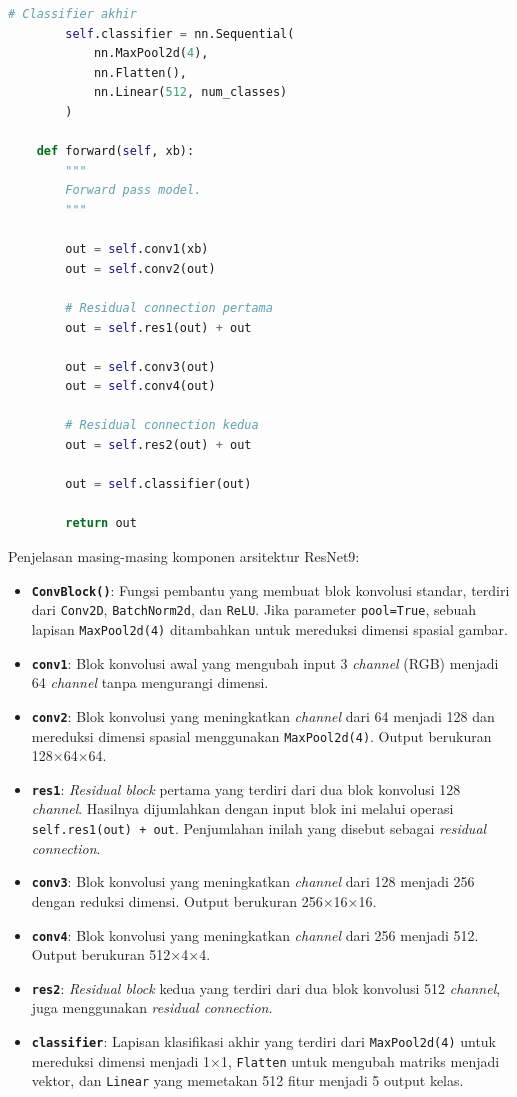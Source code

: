 \begin{lstlisting}[language=Python, caption=Membangun arsitektur ResNet9]
        # Classifier akhir
        self.classifier = nn.Sequential(
            nn.MaxPool2d(4),
            nn.Flatten(),
            nn.Linear(512, num_classes)
        )

    def forward(self, xb):
        """
        Forward pass model.
        """

        out = self.conv1(xb)
        out = self.conv2(out)

        # Residual connection pertama
        out = self.res1(out) + out

        out = self.conv3(out)
        out = self.conv4(out)

        # Residual connection kedua
        out = self.res2(out) + out

        out = self.classifier(out)

        return out
\end{lstlisting}

Penjelasan masing-masing komponen arsitektur ResNet9:

\begin{itemize}
    \item \textbf{\texttt{ConvBlock()}}: Fungsi pembantu yang membuat blok konvolusi standar, terdiri dari \texttt{Conv2D}, \texttt{BatchNorm2d}, dan \texttt{ReLU}. Jika parameter \texttt{pool=True}, sebuah lapisan \texttt{MaxPool2d(4)} ditambahkan untuk mereduksi dimensi spasial gambar.
    \item \textbf{\texttt{conv1}}: Blok konvolusi awal yang mengubah input 3 \textit{channel} (RGB) menjadi 64 \textit{channel} tanpa mengurangi dimensi.
    \item \textbf{\texttt{conv2}}: Blok konvolusi yang meningkatkan \textit{channel} dari 64 menjadi 128 dan mereduksi dimensi spasial menggunakan \texttt{MaxPool2d(4)}. Output berukuran 128×64×64.
    \item \textbf{\texttt{res1}}: \textit{Residual block} pertama yang terdiri dari dua blok konvolusi 128 \textit{channel}. Hasilnya dijumlahkan dengan input blok ini melalui operasi \texttt{self.res1(out) + out}. Penjumlahan inilah yang disebut sebagai \textit{residual connection}.
    \item \textbf{\texttt{conv3}}: Blok konvolusi yang meningkatkan \textit{channel} dari 128 menjadi 256 dengan reduksi dimensi. Output berukuran 256×16×16.
    \item \textbf{\texttt{conv4}}: Blok konvolusi yang meningkatkan \textit{channel} dari 256 menjadi 512. Output berukuran 512×4×4.
    \item \textbf{\texttt{res2}}: \textit{Residual block} kedua yang terdiri dari dua blok konvolusi 512 \textit{channel}, juga menggunakan \textit{residual connection}.
    \item \textbf{\texttt{classifier}}: Lapisan klasifikasi akhir yang terdiri dari \texttt{MaxPool2d(4)} untuk mereduksi dimensi menjadi 1×1, \texttt{Flatten} untuk mengubah matriks menjadi vektor, dan \texttt{Linear} yang memetakan 512 fitur menjadi 5 output kelas.
\end{itemize}

